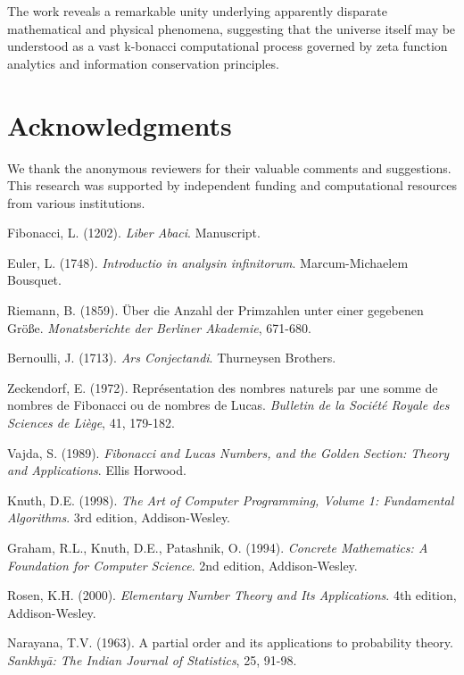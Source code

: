 \documentclass[12pt]{article}
\theoremstyle{plain}
\theoremstyle{definition}
\begin{document}
The work reveals a remarkable unity underlying apparently disparate mathematical and physical phenomena, suggesting that the universe itself may be understood as a vast k-bonacci computational process governed by zeta function analytics and information conservation principles.

\section*{Acknowledgments}

We thank the anonymous reviewers for their valuable comments and suggestions. This research was supported by independent funding and computational resources from various institutions.

\begin{thebibliography}{99}

 Fibonacci, L. (1202). \emph{Liber Abaci}. Manuscript.

 Euler, L. (1748). \emph{Introductio in analysin infinitorum}. Marcum-Michaelem Bousquet.

 Riemann, B. (1859). Über die Anzahl der Primzahlen unter einer gegebenen Größe. \emph{Monatsberichte der Berliner Akademie}, 671-680.

 Bernoulli, J. (1713). \emph{Ars Conjectandi}. Thurneysen Brothers.

 Zeckendorf, E. (1972). Représentation des nombres naturels par une somme de nombres de Fibonacci ou de nombres de Lucas. \emph{Bulletin de la Société Royale des Sciences de Liège}, 41, 179-182.

 Vajda, S. (1989). \emph{Fibonacci and Lucas Numbers, and the Golden Section: Theory and Applications}. Ellis Horwood.

 Knuth, D.E. (1998). \emph{The Art of Computer Programming, Volume 1: Fundamental Algorithms}. 3rd edition, Addison-Wesley.

 Graham, R.L., Knuth, D.E., Patashnik, O. (1994). \emph{Concrete Mathematics: A Foundation for Computer Science}. 2nd edition, Addison-Wesley.

 Rosen, K.H. (2000). \emph{Elementary Number Theory and Its Applications}. 4th edition, Addison-Wesley.

 Narayana, T.V. (1963). A partial order and its applications to probability theory. \emph{Sankhyā: The Indian Journal of Statistics}, 25, 91-98.


\end{thebibliography}
\end{document}
